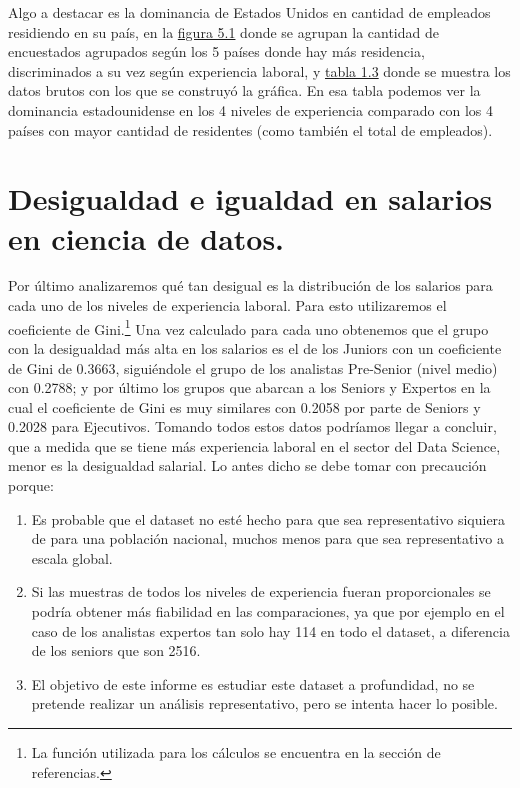 \documentclass{article}
\begin{document}
Algo a destacar es la dominancia de Estados Unidos en cantidad de empleados residiendo en su país, en la \hyperref[figura 5.1 grafico de barras agrupado]{figura 5.1} donde se agrupan la cantidad de encuestados agrupados según los 5 países donde hay más residencia, discriminados a su vez según experiencia laboral, y \hyperref[tabla 1.3]{tabla 1.3} donde se muestra los datos brutos con los que se construyó la gráfica. En esa tabla podemos ver la dominancia estadounidense en los 4 niveles de experiencia comparado con los 4 países con mayor cantidad de residentes (como también el total de empleados).
	\section{Desigualdad e igualdad en salarios en ciencia de datos.}
	Por último analizaremos qué tan desigual es la distribución de los salarios para cada uno de los niveles de experiencia laboral. Para esto utilizaremos el coeficiente de Gini.\footnote{La función utilizada para los cálculos se encuentra en la sección de referencias.}
	Una vez calculado para cada uno obtenemos que el grupo con la desigualdad más alta en los salarios es el de los Juniors con un coeficiente de Gini de 0.3663, siguiéndole el grupo de los analistas Pre-Senior (nivel medio) con 0.2788; y por último los grupos que abarcan a los Seniors y Expertos en la cual el coeficiente de Gini es muy similares con 0.2058 por parte de Seniors y 0.2028 para Ejecutivos. Tomando todos estos datos podríamos llegar a concluir, que a medida que se tiene más experiencia laboral en el sector del Data Science, menor es la desigualdad salarial. Lo antes dicho se debe tomar con  precaución porque:
	\begin{enumerate}
		\item Es probable que el dataset no esté hecho para que sea representativo siquiera de para una población nacional, muchos menos para que sea representativo a escala global.
		\item Si las muestras de todos los niveles de experiencia fueran proporcionales se podría obtener más fiabilidad en las comparaciones, ya que por ejemplo en el caso de los analistas expertos tan solo hay 114 en todo el dataset, a diferencia de los seniors que son 2516.
		\item El objetivo de este informe es estudiar este dataset a profundidad, no se pretende realizar un análisis representativo, pero se intenta hacer lo posible.
	\end{enumerate}
\end{document}
